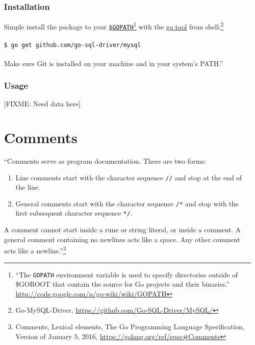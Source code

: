 \documentclass[12pt,letterpaper,dvips]{article}
\newcommand{\FIXME}[1]{\textsf{[FIXME: #1]}}
\begin{document}
\subsubsection{Installation}
Simple install the package to your
\texttt{\href{http://code.google.com/p/go-wiki/wiki/GOPATH}{\$GOPATH}}\footnote{``The
  \texttt{GOPATH} environment
  variable is used to specify directories outside of \$GOROOT
  that contain the source for Go projects and their binaries.''
  \href{http://code.google.com/p/go-wiki/wiki/GOPATH}{http://code.google.com/p/go-wiki/wiki/GOPATH}}
with the \href{http://golang.org/cmd/go/}{go tool} from
shell:\footnote{Go-MySQL-Driver, \href{https://github.com/Go-SQL-Driver/MySQL/}{https://github.com/Go-SQL-Driver/MySQL/}}\\
\\
\texttt{\$ go get github.com/go-sql-driver/mysql}\\
\\
\noindent Make sure Git is installed on your machine and in your
system's PATH.''

\subsubsection{Usage}
\FIXME{Need data here}


\newpage
\section{Comments}
``Comments serve as program documentation. There are two
forms:

\begin{enumerate}
    \item Line comments start with the character sequence
      \texttt{//} and stop at the end of the line.
    \item General comments start with the character sequence
        \texttt{/*} and stop with the first subsequent
        character sequence \texttt{*/}.
\end{enumerate}

\noindent A comment cannot start inside a rune or string literal, or
inside a comment. A general comment containing no newlines
acts like a space. Any other comment acts like a newline.''\footnote{Comments,
Lexical elements, The Go Programming Language Specification,
Version of January 5, 2016,
\href{https://golang.org/ref/spec\#Comments}{https://golang.org/ref/spec\#Comments}}
\end{document}
